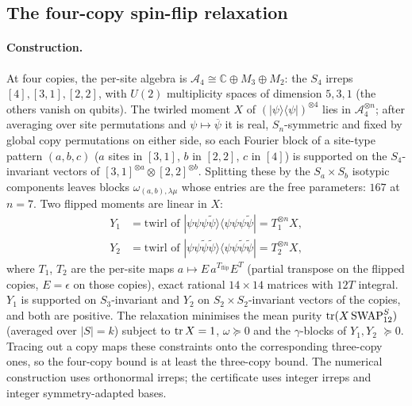 \subsection{The four-copy spin-flip relaxation}\label{sec:fourcopy}

\paragraph{Construction.} At four copies, the per-site algebra is
$\mathcal A_4\cong\mathbb C\oplus M_3\oplus M_2$: the $S_4$ irreps $[4],[3,1],[2,2]$, with $U(2)$
multiplicity spaces of dimension $5,3,1$ (the others vanish on qubits). The twirled moment $X$ of
$(|\psi\rangle\langle\psi|)^{\otimes4}$ lies in $\mathcal A_4^{\otimes n}$; after averaging over site permutations and
$\psi\mapsto\overline\psi$ it is real, $S_n$-symmetric and fixed by global copy permutations on either side, so
each Fourier block of a site-type pattern $(a,b,c)$ ($a$ sites in $[3,1]$, $b$ in $[2,2]$, $c$ in $[4]$)
is supported on the $S_4$-invariant vectors of $[3,1]^{\otimes a}\otimes[2,2]^{\otimes b}$. Splitting
these by the $S_a\times S_b$ isotypic components leaves blocks $\omega_{(a,b),\lambda\mu}$ whose entries
are the free parameters: $167$ at $n=7$. Two flipped moments are linear in $X$:
\[
 \begin{aligned}
  Y_1&=\text{twirl of }|\psi\psi\psi\tilde\psi\rangle\langle\psi\psi\psi\tilde\psi|=T_1^{\otimes n}X,\\
  Y_2&=\text{twirl of }|\psi\psi\tilde\psi\tilde\psi\rangle\langle\psi\psi\tilde\psi\tilde\psi|=T_2^{\otimes n}X,
 \end{aligned}
\]
where $T_1$, $T_2$ are the per-site maps $a\mapsto E\,a^{T_{\mathrm{flip}}}E^{T}$ (partial transpose on
the flipped copies, $E=\epsilon$ on those copies), exact rational $14\times14$ matrices with $12T$
integral. $Y_1$ is supported on $S_3$-invariant and $Y_2$ on $S_2\times S_2$-invariant vectors of the
copies, and both are positive. The relaxation minimises the mean purity $\operatorname{tr}(X\,\mathrm{SWAP}_{12}^{S})$
(averaged over $|S|=k$) subject to $\operatorname{tr} X=1$, $\omega\succeq0$ and the $\gamma$-blocks of $Y_1,Y_2$
$\succeq0$. Tracing out a copy maps these constraints onto the corresponding three-copy ones, so the
four-copy bound is at least the three-copy bound. The numerical construction uses orthonormal irreps;
the certificate uses integer irreps and integer symmetry-adapted bases.

